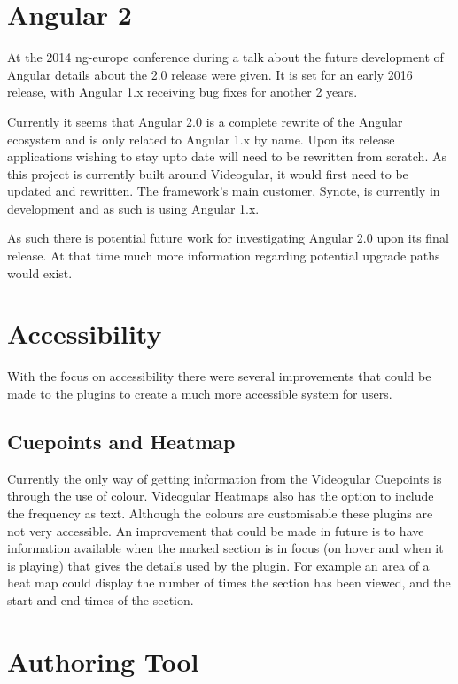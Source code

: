 \section{Angular 2}

At the 2014 ng-europe conference during a talk about the future development of Angular details about the 2.0 release were given. It is set for an early 2016 release, with Angular 1.x receiving bug fixes for another 2 years. 

Currently it seems that Angular 2.0 is a complete rewrite of the Angular ecosystem and is only related to Angular 1.x by name. Upon its release applications wishing to stay upto date will need to be rewritten from scratch. As this project is currently built around Videogular, it would first need to be updated and rewritten. The framework's main customer, Synote, is currently in development and as such is using Angular 1.x. 

As such there is potential future work for investigating Angular 2.0 upon its final release. At that time much more information regarding potential upgrade paths would exist.

\section{Accessibility}

With the focus on accessibility there were several improvements that could be made to the plugins to create a much more accessible system for users.

\subsection{Cuepoints and Heatmap}

Currently the only way of getting information from the \gls{Videogular} Cuepoints is through the use of colour. \gls{Videogular} Heatmaps also has the option to include the frequency as text. Although the colours are customisable these plugins are not very accessible. An improvement that could be made in future is to have information available when the marked section is in focus (on hover and when it is playing) that gives the details used by the plugin. For example an area of a heat map could display the number of times the section has been viewed, and the start and end times of the section.

\section{Authoring Tool}


